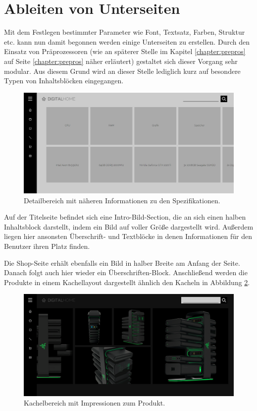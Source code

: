 \section{Ableiten von Unterseiten}
Mit dem Festlegen bestimmter Parameter wie Font, Textsatz, Farben, Struktur etc. kann nun damit begonnen werden einige Unterseiten zu erstellen. Durch den Einsatz von Präprozessoren (wie an späterer Stelle im Kapitel \ref{chapter:prepros} auf Seite \ref{chapter:prepros} näher erläutert) gestaltet sich dieser Vorgang sehr modular. Aus diesem Grund wird an dieser Stelle lediglich kurz auf besondere Typen von Inhaltsblöcken eingegangen.

\begin{figure} [h]
	\includegraphics[width=\textwidth]{./img/unters_details.png}
	\caption{Detailbereich mit näheren Informationen zu den Spezifikationen.}
	\label{unters:details}
\end{figure}

Auf der Titelseite befindet sich eine Intro-Bild-Section, die an sich einen halben Inhaltsblock darstellt, indem ein Bild auf voller Größe dargestellt wird. Außerdem liegen hier ansonsten Überschrift- und Textblöcke in denen Informationen für den Benutzer ihren Platz finden.

Die Shop-Seite erhält ebenfalls ein Bild in halber Breite am Anfang der Seite. Danach folgt auch hier wieder ein Überschriften-Block. Anschließend werden die Produkte in einem Kachellayout dargestellt ähnlich den Kacheln in Abbildung \ref{unters:impress}.

\begin{figure} [h]
	\includegraphics[width=\textwidth]{./img/unters_impress.png}
	\caption{Kachelbereich mit Impressionen zum Produkt.}
	\label{unters:impress}
\end{figure}

